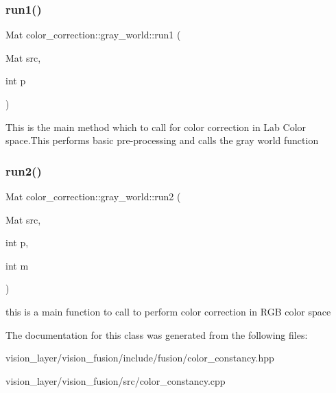 \subsubsection{\texorpdfstring{run1()}{run1()}}
{\footnotesize\ttfamily Mat color\+\_\+correction\+::gray\+\_\+world\+::run1 (\begin{DoxyParamCaption}\item[{Mat}]{src,  }\item[{int}]{p }\end{DoxyParamCaption})}

This is the main method which to call for color correction in Lab Color space.\+This performs basic pre-\/processing and calls the gray world function \mbox{\label{classcolor__correction_1_1gray__world_afe9a7e290fa94f8b0c5d67e88b4f206e}} 
\subsubsection{\texorpdfstring{run2()}{run2()}}
{\footnotesize\ttfamily Mat color\+\_\+correction\+::gray\+\_\+world\+::run2 (\begin{DoxyParamCaption}\item[{Mat}]{src,  }\item[{int}]{p,  }\item[{int}]{m }\end{DoxyParamCaption})}

this is a main function to call to perform color correction in R\+GB color space 

The documentation for this class was generated from the following files\+:\begin{DoxyCompactItemize}
\item 
vision\+\_\+layer/vision\+\_\+fusion/include/fusion/color\+\_\+constancy.\+hpp\item 
vision\+\_\+layer/vision\+\_\+fusion/src/color\+\_\+constancy.\+cpp\end{DoxyCompactItemize}
